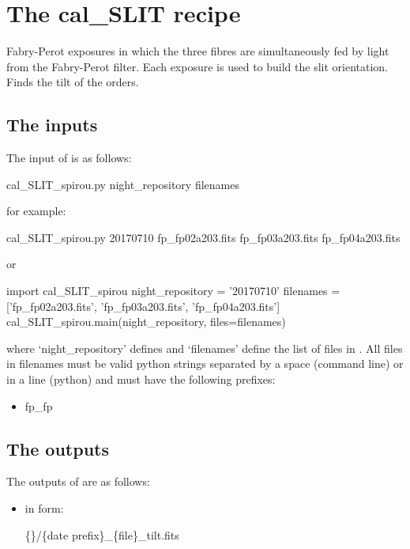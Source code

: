 \clearpage
\newpage
\section{The cal\_SLIT recipe}
\label{ch:the_recipes:cal_SLIT_spirou}

Fabry-Perot exposures in which the three fibres are simultaneously fed by light from the Fabry-Perot filter. Each exposure is used to build the slit orientation. Finds the tilt of the orders. \\

\subsection{The inputs}
The input of {\calSLIT} is as follows:
\begin{cmdbox}
cal_SLIT_spirou.py night_repository filenames
\end{cmdbox}
\noindent for example:
\begin{cmdbox}
cal_SLIT_spirou.py 20170710 fp_fp02a203.fits fp_fp03a203.fits fp_fp04a203.fits
\end{cmdbox}
\noindent or
\begin{pythonbox}
import cal_SLIT_spirou
night_repository = '20170710'
filenames = ['fp_fp02a203.fits', 'fp_fp03a203.fits', 'fp_fp04a203.fits']
cal_SLIT_spirou.main(night_repository, files=filenames)
\end{pythonbox}

\noindent where `night\_repository' defines \argnightname and `filenames' define the list of files in \argfilenames. All files in filenames must be valid python strings separated by a space (command line) or in a line (python) and must have the following prefixes:
\begin{itemize}
	\item fp\_fp
\end{itemize}

\subsection{The outputs}
The outputs of \calSLIT are as follows:

\begin{itemize}
\item {} in form:
\begin{tcustomdir}
\{\reduceddir\}/\{date prefix\}\_\{file\}\_tilt.fits
\end{tcustomdir}

\end{itemize}

